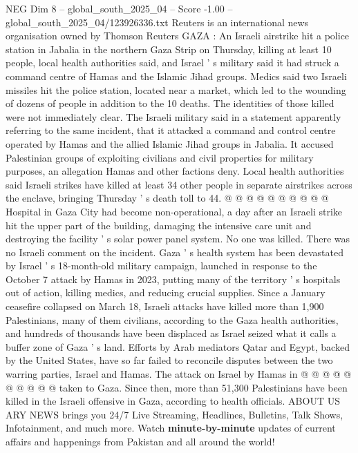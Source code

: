 \begin{textsample}{NEG Dim 8 – global\_south\_2025\_04 – Score -1.00 – global\_south\_2025\_04/123926336.txt}  \label{ex:f8_neg_282}
Reuters is an international news organisation owned by Thomson Reuters GAZA : An Israeli airstrike hit a police station in Jabalia in the northern Gaza Strip on Thursday, killing at least 10 people, local health authorities said, and Israel ' s military said it had struck a command centre of Hamas and the Islamic Jihad groups.
Medics said two Israeli missiles hit the police station, located near a market, which led to the wounding of dozens of people in addition to the 10 deaths.
The identities of those killed were not immediately clear.
The Israeli military said in a statement apparently referring to the same incident, that it attacked a command and control centre operated by Hamas and the allied Islamic Jihad groups in Jabalia.
It accused Palestinian groups of exploiting civilians and civil properties for military purposes, an allegation Hamas and other factions deny.
Local health authorities said Israeli strikes have killed at least 34 other people in separate airstrikes across the enclave, bringing Thursday ' s death toll to 44. @ @ @ @ @ @ @ @ @ @ Hospital in Gaza City had become non-operational, a day after an Israeli strike hit the upper part of the building, damaging the intensive care unit and destroying the facility ' s solar power panel system.
No one was killed.
There was no Israeli comment on the incident.
Gaza ' s health system has been devastated by Israel ' s 18-month-old military campaign, launched in response to the October 7 attack by Hamas in 2023, putting many of the territory ' s hospitals out of action, killing medics, and reducing crucial supplies.
Since a January ceasefire collapsed on March 18, Israeli attacks have killed more than 1,900 Palestinians, many of them civilians, according to the Gaza health authorities, and hundreds of thousands have been displaced as Israel seized what it calls a buffer zone of Gaza ' s land.
Efforts by Arab mediators Qatar and Egypt, backed by the United States, have so far failed to reconcile disputes between the two warring parties, Israel and Hamas.
The attack on Israel by Hamas in @ @ @ @ @ @ @ @ @ @ taken to Gaza.
Since then, more than 51,300 Palestinians have been killed in the Israeli offensive in Gaza, according to health officials.
ABOUT US ARY NEWS brings you 24/7 Live Streaming, Headlines, Bulletins, Talk Shows, Infotainment, and much more.
Watch \textbf{minute-by-minute} updates of current affairs and happenings from Pakistan and all around the world!

\end{textsample}
